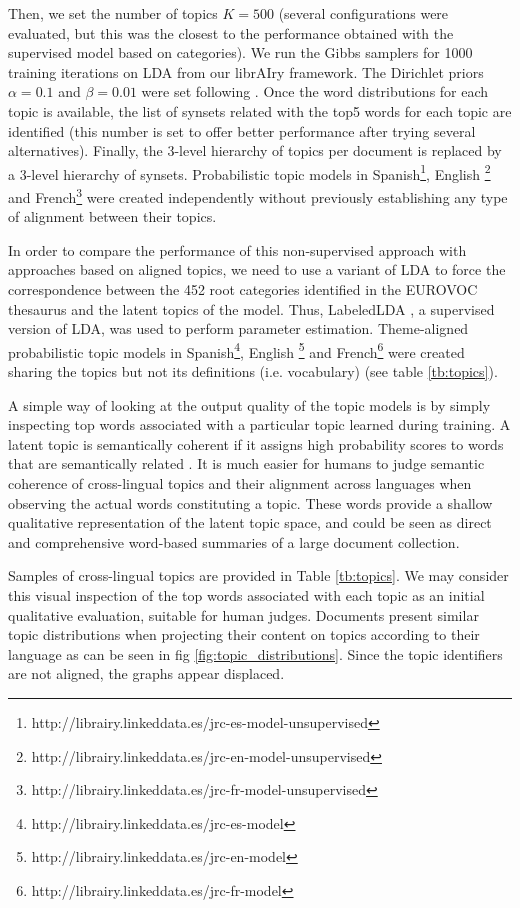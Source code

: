  Then, we set the number of topics $K=500$ (several configurations were evaluated, but this was the closest to the performance obtained with the supervised model based on categories). We run the Gibbs samplers for 1000 training iterations on LDA from our librAIry framework. The Dirichlet priors $\alpha=0.1$ and $\beta=0.01$ were set following \citep{Hu2014a}. Once the word distributions for each topic is available, the list of synsets related with the top5 words for each topic are identified (this number is set to offer better performance after trying several alternatives). Finally, the 3-level hierarchy of topics per document is replaced by a 3-level hierarchy of synsets. Probabilistic topic models in Spanish\footnote{http://librairy.linkeddata.es/jrc-es-model-unsupervised}, English \footnote{http://librairy.linkeddata.es/jrc-en-model-unsupervised} and French\footnote{http://librairy.linkeddata.es/jrc-fr-model-unsupervised} were created independently without previously establishing any type of alignment between their topics.
 
 In order to compare the performance of this non-supervised approach with approaches based on aligned topics, we need to use a variant of LDA to force the correspondence between the 452 root categories identified in the EUROVOC thesaurus and the latent topics of the model. Thus, LabeledLDA \citep{Ramage2009a}, a supervised version of LDA, was used to perform parameter estimation. Theme-aligned probabilistic topic models in Spanish\footnote{http://librairy.linkeddata.es/jrc-es-model}, English \footnote{http://librairy.linkeddata.es/jrc-en-model} and French\footnote{http://librairy.linkeddata.es/jrc-fr-model} were created sharing the topics but not its definitions (i.e. vocabulary) (see table \ref{tb:topics}).

A simple way of looking at the output quality of the topic models is by simply inspecting top words associated with a particular topic learned during training. A latent topic is semantically coherent if it assigns high probability scores to words that are semantically related \citep{Gliozzo2007, newman-etal-2010-automatic, mimno-etal-2011-optimizing}. It is much easier for humans to judge semantic coherence of cross-lingual topics and their alignment across languages when observing the actual words constituting a topic. These words provide a shallow qualitative representation of the latent topic space, and could be seen as direct and comprehensive word-based summaries of a large document collection.

Samples of cross-lingual topics are provided in Table \ref{tb:topics}. We may consider this visual inspection of the top words associated with each topic as an initial qualitative evaluation, suitable for human judges. Documents present similar topic distributions when projecting their content on topics according to their language as can be seen in fig \ref{fig:topic_distributions}. Since the topic identifiers are not aligned, the graphs appear displaced.

